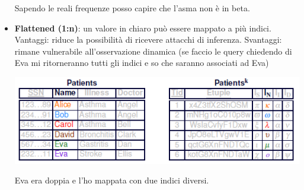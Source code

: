 \begin{itemize}
\begin{center}
    \end{center}
    Sapendo le reali frequenze posso capire che l'asma non è in beta.
    \item \textbf{Flattened (1:n)}: un valore in chiaro può essere mappato a più indici. Vantaggi: riduce la possibilità di ricevere attacchi di inferenza. Svantaggi: rimane vulnerabile all'osservazione dinamica (se faccio le query chiedendo di Eva mi ritorneranno tutti gli indici e so che saranno associati ad Eva)
    \begin{center}
        \includegraphics[scale=0.6]{img/flattind.png}
    \end{center}
    Eva era doppia e l'ho mappata con due indici diversi. 
\end{itemize}

